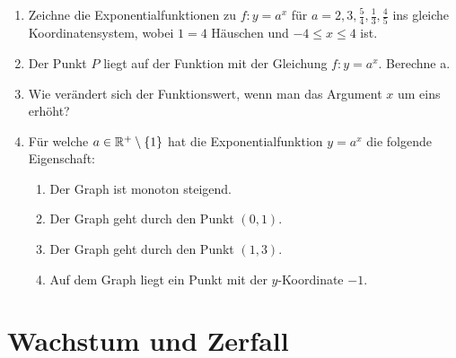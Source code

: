 \documentclass[11pt,oneside]{article}
\begin{document}
	\begin{aufgabe}
		\begin{enumerate}
			\item Zeichne die Exponentialfunktionen zu $f:y=a^x$ für $a=2,3,\frac{5}{4},\frac{1}{3},\frac{4}{5}$ ins gleiche Koordinatensystem, wobei $1=4$ Häuschen und $-4\leq x\leq 4$ ist.
			\item Der Punkt $P$ liegt auf der Funktion mit der Gleichung $f:y=a^x$. Berechne a. 
			\item Wie verändert sich der Funktionswert, wenn man das Argument $x$ um eins erhöht?
			\item Für welche $a\in\mathbb{R}^+\setminus\{1\}$ hat die Exponentialfunktion $y=a^x$ die folgende Eigenschaft:
			\begin{enumerate}[label=\alph*)]
				\item Der Graph ist monoton steigend.
				\item Der Graph geht durch den Punkt $(0,1)$.
				\item Der Graph geht durch den Punkt $(1,3)$.
				\item Auf dem Graph liegt ein Punkt mit der $y$-Koordinate $-1$.
			\end{enumerate}
		\end{enumerate}
	\end{aufgabe}


\newpage
\section{Wachstum und Zerfall}
\end{document}
